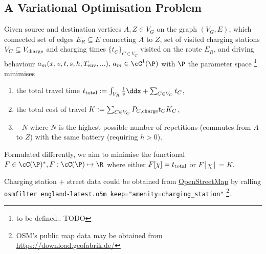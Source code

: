 \documentclass{prettytex/ox/mmsc-special-topic}
\begin{document}
  \subsection{A Variational Optimisation Problem}
  Given source and destination vertices $A, Z \in V_G$ on the graph $(V_G, E)$, which connected set of edges $E_R \subseteq E$ connecting $A$ to $Z$,
  set of visited charging stations $V_C \subseteq V_{\rm charge}$ and charging times $\{t_C\}_{C \in V_C}$ visited on the route $E_R$, and driving behaviour $a_m(x, v, t, s, h, T_{\rm env}, ...),\, a_m \in \cC^1(\P)$ with $\P$ the parameter space \footnote{to be defined.. TODO} minimises
  \begin{enumerate}
    \item the total travel time $t_{\rm total} := \int_{V_R} \frac{1}{v} \ddx + \sum_{C \in V_C} t_C$,
    \item the total cost of travel $K := \sum_{C \in V_C} P_{C, \rm charge} t_{C} K_C$,
    \item $-N$ where $N$ is the highest possible number of repetitions (commutes from $A$ to $Z$) with the same battery (requiring $h > 0$).
  \end{enumerate}
  Formulated differently, we aim to minimise the functional
  $F \in \cC(\P)^*, F: \cC(\P) \mapsto \R$ where either $F[\chi] = t_{\rm total}$ or $F[\chi] = K$.

  Charging station + street data could be obtained from \href{https://osm.org/}{OpenStreetMap} by calling \\
  \texttt{osmfilter england-latest.o5m \-\-keep="amenity=charging\_station"} \footnote{OSM's public map data may be obtained from \url{https://download.geofabrik.de/}}.

\end{document}
